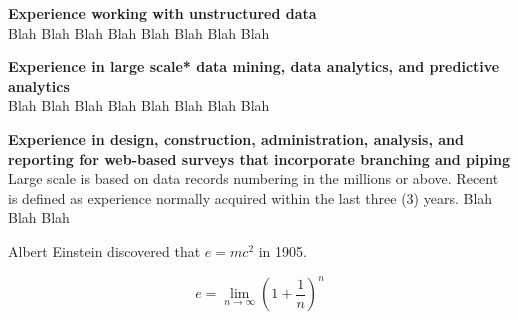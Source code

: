 \textbf{Experience working with unstructured data\\}
Blah Blah Blah Blah Blah Blah Blah Blah 

\textbf{Experience in large scale* data mining, data analytics, and predictive analytics\\}
Blah Blah Blah Blah Blah Blah Blah Blah 

\textbf{Experience in design, construction, administration, analysis, and reporting for web-based surveys that incorporate branching and piping\\}
Large scale is based on data records numbering in the millions or above.
Recent is defined as experience normally acquired within the last three (3) years. Blah Blah Blah 




Albert Einstein discovered that $e=mc^2$ in 1905.

\[ e=\lim_{n \to \infty} \left(1+\frac{1}{n}\right)^n \]

\makeletterclosing
